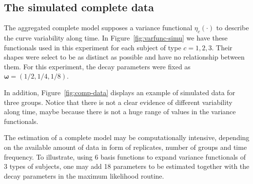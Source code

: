 



\subsection{The simulated complete data}
\label{sec:comp-fit}




The aggregated complete model supposes a variance functional $\eta_c(\cdot)$ to describe the curve variability along time. In Figure~\ref{fig:varfunc-simu} we have these functionals used in this experiment for each subject of type $c=1,2,3$. Their shapes were select to be as distinct as possible and have no relationship between them. For this experiment, the decay parameters were fixed as $\boldsymbol \omega = (1/2,1/4,1/8)$.

In addition, Figure~\ref{fig:comp-data} displays an example of simulated data for three groups. Notice that there is not a clear evidence of different variability along time, maybe because there is not a huge range of values in the variance functionals.

The estimation of a complete model may be computationally intensive, depending on the available  amount of data in form of replicates, number of groups and time frequency. To illustrate, using 6 basis functions to expand variance functionals of 3 types of subjects, one may add 18 parameters to be estimated together with the decay parameters in the maximum likelihood routine.

